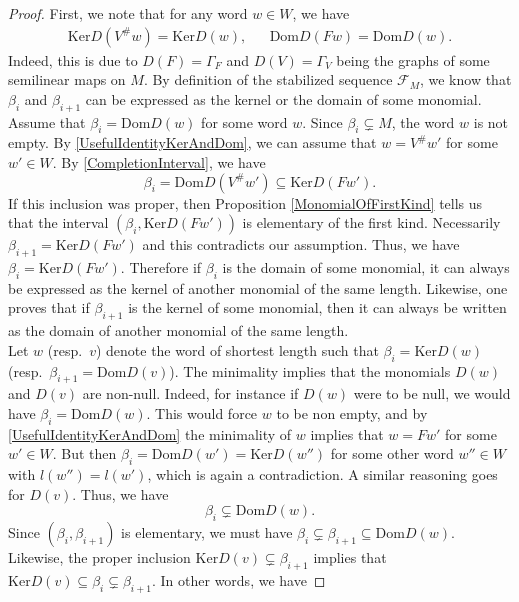 \documentclass[12pt]{amsart}
\theoremstyle{definition}
\newcommand{\<}{\langle}   %
\renewcommand{\>}{\rangle} %
\begin{document}
\begin{proof}
    First, we note that for any word $w \in W$, we have 
    \begin{align}\label{UsefulIdentityKerAndDom}
        \mathrm{Ker}D(V^{\#}w) = \mathrm{Ker}D(w), & & \mathrm{Dom} D(Fw) = \mathrm{Dom} D(w).
    \end{align}
    Indeed, this is due to $D(F) = \Gamma_F$ and $D(V) = \Gamma_V$ being the graphs of some semilinear maps on $M$. By definition of the stabilized sequence $\mathcal F_M$, we know that $\beta_i$ and $\beta_{i+1}$ can be expressed as the kernel or the domain of some monomial. \\
    Assume that $\beta_i = \mathrm{Dom}D(w)$ for some word $w$. Since $\beta_i \subsetneq M$, the word $w$ is not empty. By \eqref{UsefulIdentityKerAndDom}, we can assume that $w = V^{\#}w'$ for some $w' \in W$. By \eqref{CompletionInterval}, we have 
    \begin{equation*}
        \beta_i = \mathrm{Dom}D(V^{\#}w') \subseteq  \mathrm{Ker}D(Fw').
    \end{equation*}
    If this inclusion was proper, then Proposition \ref{MonomialOfFirstKind} tells us that the interval $(\beta_i, \mathrm{Ker}D(Fw'))$ is elementary of the first kind. Necessarily $\beta_{i+1} = \mathrm{Ker}D(Fw')$ and this contradicts our assumption. Thus, we have $\beta_i = \mathrm{Ker}D(Fw')$. Therefore if $\beta_i$ is the domain of some monomial, it can always be expressed as the kernel of another monomial of the same length. Likewise, one proves that if $\beta_{i+1}$ is the kernel of some monomial, then it can always be written as the domain of another monomial of the same length.\\
    Let $w$ (resp.~$v$) denote the word of shortest length such that $\beta_i = \mathrm{Ker}D(w)$ (resp.~$\beta_{i+1} = \mathrm{Dom}D(v)$). The minimality implies that the monomials $D(w)$ and $D(v)$ are non-null. Indeed, for instance if $D(w)$ were to be null, we would have $\beta_i = \mathrm{Dom}D(w)$. This would force $w$ to be non empty, and by \eqref{UsefulIdentityKerAndDom} the minimality of $w$ implies that $w = Fw'$ for some $w' \in W$. But then $\beta_i = \mathrm{Dom}D(w') = \mathrm{Ker}D(w'')$ for some other word $w'' \in W$ with $l(w'') = l(w')$, which is again a contradiction. A similar reasoning goes for $D(v)$. Thus, we have 
    \begin{equation*}
        \beta_i \subsetneq \mathrm{Dom}D(w).
    \end{equation*}
    Since $(\beta_i,\beta_{i+1})$ is elementary, we must have $\beta_i \subsetneq \beta_{i+1} \subseteq  \mathrm{Dom}D(w)$. Likewise, the proper inclusion $\mathrm{Ker}D(v) \subsetneq \beta_{i+1}$ implies that $\mathrm{Ker}D(v) \subseteq  \beta_i \subsetneq \beta_{i+1}$. In other words, we have

\end{proof}
\end{document}
